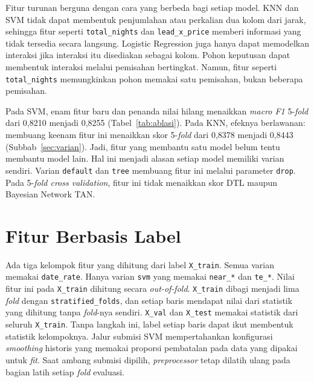 Fitur turunan berguna dengan cara yang berbeda bagi setiap model. KNN dan SVM
tidak dapat membentuk penjumlahan atau perkalian dua kolom dari jarak, sehingga
fitur seperti \texttt{total\_nights} dan \texttt{lead\_x\_price} memberi
informasi yang tidak tersedia secara langsung. Logistic Regression juga hanya
dapat memodelkan interaksi jika interaksi itu disediakan sebagai kolom. Pohon
keputusan dapat membentuk interaksi melalui pemisahan bertingkat. Namun, fitur
seperti \texttt{total\_nights} memungkinkan pohon memakai satu pemisahan, bukan
beberapa pemisahan.

Pada SVM, enam fitur baru dan penanda nilai hilang menaikkan \textit{macro F1}
5-\textit{fold} dari 0,8210 menjadi 0,8255 (Tabel~\ref{tab:ablasi}). Pada KNN,
efeknya berlawanan: membuang keenam fitur ini menaikkan skor 5-\textit{fold} dari
0,8378 menjadi 0,8443 (Subbab~\ref{sec:varian}). Jadi, fitur yang membantu satu
model belum tentu membantu model lain. Hal ini menjadi alasan setiap model
memiliki varian sendiri. Varian \texttt{default} dan \texttt{tree} membuang fitur ini melalui parameter
\texttt{drop}. Pada 5-\textit{fold cross validation}, fitur ini tidak menaikkan
skor DTL maupun Bayesian Network TAN.



\section{Fitur Berbasis Label}
\label{sec:label}

Ada tiga kelompok fitur yang dihitung dari label \texttt{X\_train}. Semua varian
memakai \texttt{date\_rate}. Hanya varian \texttt{svm} yang memakai
\texttt{near\_*} dan \texttt{te\_*}. Nilai fitur ini pada \texttt{X\_train}
dihitung secara \textit{out-of-fold}. \texttt{X\_train} dibagi menjadi lima
\textit{fold} dengan \texttt{stratified\_folds}, dan setiap baris mendapat nilai
dari statistik yang dihitung tanpa \textit{fold}-nya sendiri. \texttt{X\_val} dan
\texttt{X\_test} memakai statistik dari seluruh \texttt{X\_train}. Tanpa langkah
ini, label setiap baris dapat ikut membentuk statistik kelompoknya.
Jalur submisi SVM mempertahankan konfigurasi \textit{smoothing} historis
yang memakai proporsi pembatalan pada data yang dipakai untuk \textit{fit}.
Saat ambang submisi dipilih, \textit{preprocessor} tetap dilatih ulang pada
bagian latih setiap \textit{fold} evaluasi.

